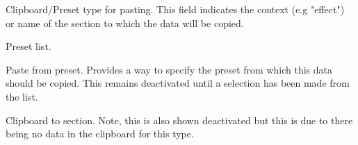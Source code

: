    Clipboard/Preset type for pasting.
   This field indicates the context (e.g "effect") or name of the
   section to which the data will be copied.

   Preset list.

   Paste from preset.
   Provides a way to specify the preset from which this data should be copied.
   This remains deactivated until a selection has been made from the list.

   Clipboard to section. Note, this is also shown deactivated but this is due to there
   being no data in the clipboard for this type.

